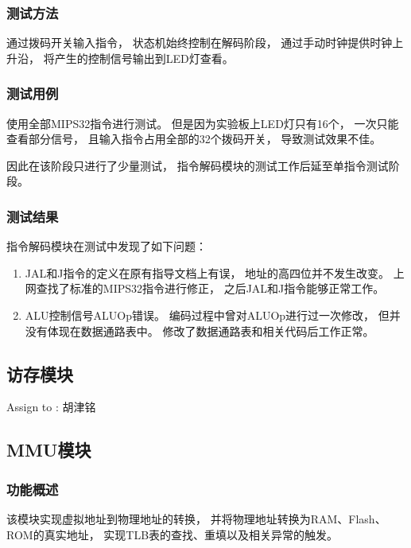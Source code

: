         \subsubsection{测试方法}
            通过拨码开关输入指令，%
            状态机始终控制在解码阶段，%
            通过手动时钟提供时钟上升沿，%
            将产生的控制信号输出到LED灯查看。%

        \subsubsection{测试用例}
            使用全部MIPS32指令进行测试。%
            但是因为实验板上LED灯只有16个，%
            一次只能查看部分信号，%
            且输入指令占用全部的32个拨码开关，%
            导致测试效果不佳。%

            因此在该阶段只进行了少量测试，%
            指令解码模块的测试工作后延至单指令测试阶段。

        \subsubsection{测试结果}
            指令解码模块在测试中发现了如下问题：
            \begin{enumerate}
            \item
                JAL和J指令的定义在原有指导文档上有误，%
                地址的高四位并不发生改变。%
                上网查找了标准的MIPS32指令进行修正，%
                之后JAL和J指令能够正常工作。
            \item
                ALU控制信号ALUOp错误。%
                编码过程中曾对ALUOp进行过一次修改，%
                但并没有体现在数据通路表中。%
                修改了数据通路表和相关代码后工作正常。
            \end{enumerate}

    \subsection{访存模块}
        Assign to : 胡津铭

    \subsection{MMU模块}
        \subsubsection{功能概述}
            该模块实现虚拟地址到物理地址的转换，%
            并将物理地址转换为RAM、Flash、ROM的真实地址，%
            实现TLB表的查找、重填以及相关异常的触发。%

